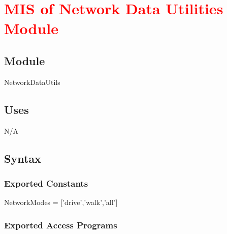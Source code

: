 \documentclass[12pt, titlepage]{article}
\begin{document}
\section{\textcolor{red}{MIS of Network Data Utilities Module}} \label{Network Data Utilities}
\subsection{Module}
NetworkDataUtils

\subsection{Uses}
N/A

\subsection{Syntax}

\subsubsection{Exported Constants}
NetworkModes = ['drive','walk','all']

\subsubsection{Exported Access Programs}
\end{document}
